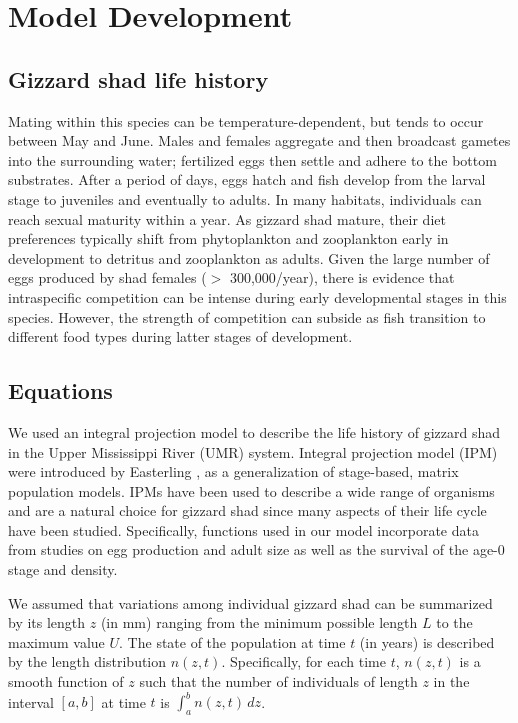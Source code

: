 \documentclass[preprint,review,12pt,authoryear]{elsarticle}
\def\ds{\displaystyle}
\begin{document}
\section{Model Development}
\subsection{Gizzard shad life history}
Mating within this species can be temperature-dependent, but tends to occur between May and June. 
Males and females aggregate and then broadcast gametes into the surrounding water; fertilized eggs then settle and adhere to the bottom substrates. 
After a period of days, eggs hatch and fish develop from the larval stage to juveniles and eventually to adults. 
In many habitats, individuals can reach sexual maturity within a year. As gizzard shad mature, their diet preferences typically shift from phytoplankton and zooplankton early in development to detritus and zooplankton as adults. 
Given the large number of eggs produced by shad females ($>$ 300,000/year), there is evidence that intraspecific competition can be intense during early developmental stages in this species. 
However, the strength of competition can subside as fish transition to different food types during latter stages of development.   

\subsection{Equations}
We used an integral projection model to describe the life history of gizzard shad in the Upper Mississippi River (UMR) system. 
Integral projection model (IPM) were introduced by Easterling \citep{easterling2000size}, as a generalization of stage-based, matrix population models. 
IPMs have been used to describe a wide range of organisms \citep{ellner2016data, merow2014advancing, rees2014building} and are a natural choice for gizzard shad since many aspects of their life cycle have been studied. 
Specifically, functions used in our model incorporate data from studies on egg production and adult size as well as the survival of the age-0 stage and density. 

We assumed that variations among individual gizzard shad can be summarized by its length $z$ (in mm) ranging from the minimum possible length $L$ to the maximum value $U$. 
The state of the population at time $t$ (in years) is described by the length distribution $n(z,t)$. 
Specifically, for each time $t$, $n(z,t)$ is a smooth function of $z$ such that the number of individuals of length $z$ in the interval $[a,b]$ at time $t$ is $\ds \int_a^b n(z,t) \, dz$. 
\end{document}
